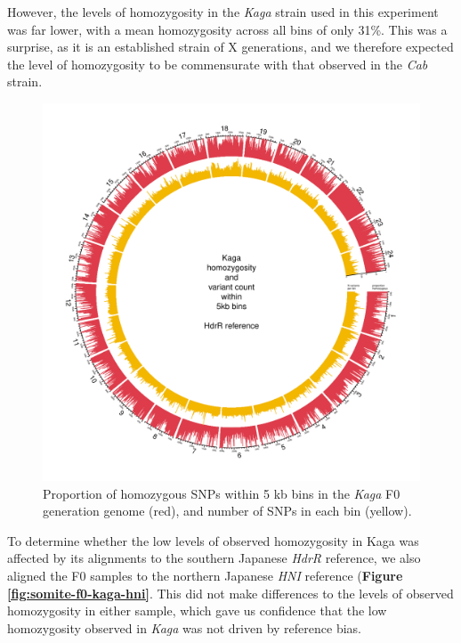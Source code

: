 \documentclass[
]{book}
\begin{document}
However, the levels of homozygosity in the \emph{Kaga} strain used in this experiment was far lower, with a mean homozygosity across all bins of only 31\%. This was a surprise, as it is an established strain of X generations, and we therefore expected the level of homozygosity to be commensurate with that observed in the \emph{Cab} strain.



\begin{figure}
\includegraphics[width=1\linewidth]{figs/somites/Kaga} \caption{Proportion of homozygous SNPs within 5 kb bins in the \emph{Kaga} F0 generation genome (red), and number of SNPs in each bin (yellow).}\label{fig:somite-f0-kaga}
\end{figure}

To determine whether the low levels of observed homozygosity in Kaga was affected by its alignments to the southern Japanese \emph{HdrR} reference, we also aligned the F0 samples to the northern Japanese \emph{HNI} reference (\textbf{Figure \ref{fig:somite-f0-kaga-hni}}. This did not make differences to the levels of observed homozygosity in either sample, which gave us confidence that the low homozygosity observed in \emph{Kaga} was not driven by reference bias.
\end{document}
